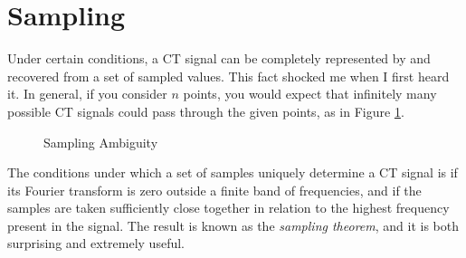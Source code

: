 \section{Sampling}

Under certain conditions,
a CT signal can be completely
represented by and recovered from
a set of sampled values. This fact
shocked me when I first heard it.
In general, if you consider
$n$ points, you would expect that
infinitely many possible CT signals
could pass through the given points,
as in Figure \ref{fig:sampling_ambiguity}.
\begin{figure}[htbp]
    \centering
    \caption{Sampling Ambiguity}
    \label{fig:sampling_ambiguity}
\end{figure}
The conditions under which a set of
samples uniquely determine a CT signal
is if its Fourier transform is zero
outside a finite band of frequencies,
and if the samples are taken sufficiently
close together in relation to the highest
frequency present in the signal. The result
is known as the \emph{sampling theorem}, and
it is both surprising and extremely useful.

